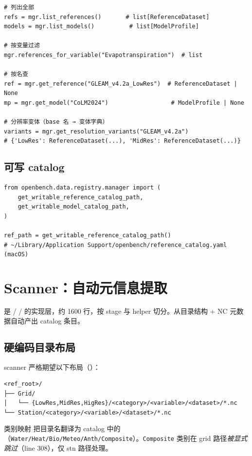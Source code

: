 \begin{verbatim}
# 列出全部
refs = mgr.list_references()       # list[ReferenceDataset]
models = mgr.list_models()          # list[ModelProfile]

# 按变量过滤
mgr.references_for_variable("Evapotranspiration")  # list

# 按名查
ref = mgr.get_reference("GLEAM_v4.2a_LowRes")  # ReferenceDataset | None
mp = mgr.get_model("CoLM2024")                  # ModelProfile | None

# 分辨率变体（base 名 → 变体字典）
variants = mgr.get_resolution_variants("GLEAM_v4.2a")
# {'LowRes': ReferenceDataset(...), 'MidRes': ReferenceDataset(...)}
\end{verbatim}

\subsection{可写 catalog}

\begin{verbatim}
from openbench.data.registry.manager import (
    get_writable_reference_catalog_path,
    get_writable_model_catalog_path,
)

ref_path = get_writable_reference_catalog_path()
# ~/Library/Application Support/openbench/reference_catalog.yaml (macOS)
\end{verbatim}

\section{Scanner：自动元信息提取}

 是  /  /  的实现层，约 1600 行，按 stage 与 helper 切分。从目录结构 + NC 元数据自动产出 catalog 条目。

\subsection{硬编码目录布局}

scanner 严格期望以下布局（）：

\begin{verbatim}
<ref_root>/
├── Grid/
│   └── {LowRes,MidRes,HigRes}/<category>/<variable>/<dataset>/*.nc
└── Station/<category>/<variable>/<dataset>/*.nc
\end{verbatim}

类别映射  把目录名翻译为 catalog 中的 （\texttt{Water/Heat/Bio/Meteo/Anth/Composite}）。\texttt{Composite} 类别在 grid 路径\emph{被显式跳过}（line 308），仅 stn 路径处理。

